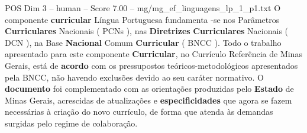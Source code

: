 \begin{textsample}{POS Dim 3 – human – Score 7.00 – mg/mg\_ef\_linguagens\_lp\_1\_p1.txt}  \label{ex:f3_pos_007}
O componente \textbf{curricular} Língua Portuguesa fundamenta -se nos Parâmetros \textbf{Curriculares} Nacionais ( PCNs ), nas \textbf{Diretrizes} \textbf{Curriculares} Nacionais ( DCN ), na Base \textbf{Nacional} Comum \textbf{Curricular} ( BNCC ).
Todo o trabalho apresentado para este componente \textbf{Curricular}, no Currículo Referência de Minas Gerais, está de \textbf{acordo} com os pressupostos teóricos-metodológicos apresentados pela BNCC, não havendo exclusões devido ao seu caráter normativo.
O \textbf{documento} foi complementado com as orientações produzidas pelo \textbf{Estado} de Minas Gerais, acrescidas de atualizações e \textbf{especificidades} que agora se fazem necessárias à criação do novo currículo, de forma que atenda às demandas surgidas pelo regime de colaboração.

\end{textsample}
